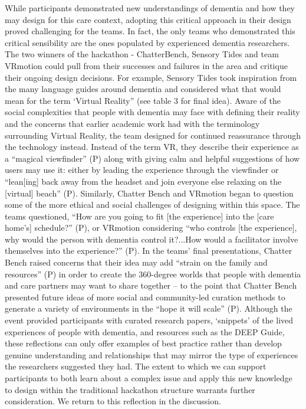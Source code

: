 While participants demonstrated new understandings of dementia and how they may design for this care context, adopting this critical approach in their design proved challenging for the teams. In fact, the only teams who demonstrated this critical sensibility are the ones populated by experienced dementia researchers. The two winners of the hackathon - ChatterBench, Sensory Tides and team VRmotion could pull from their successes and failures in the area and critique their ongoing design decisions. For example, Sensory Tides took inspiration from the many language guides around dementia and considered what that would mean for the term ‘Virtual Reality” (see table 3 for final idea). Aware of the social complexities that people with dementia may face with defining their reality and the concerns that earlier academic work had with the terminology surrounding Virtual Reality, the team designed for continued reassurance through the technology instead. Instead of the term VR, they describe their experience as a “magical viewfinder” (P) along with giving calm and helpful suggestions of how users may use it: either by leading the experience through the viewfinder or “lean[ing] back away from the headset and join everyone else relaxing on the [virtual] beach” (P). Similarly, Chatter Bench and VRmotion began to question some of the more ethical and social challenges of designing within this space. The teams questioned, “How are you going to fit [the experience] into the [care home’s] schedule?” (P), or VRmotion considering “who controls [the experience], why would the person with dementia control it?...How would a facilitator involve themselves into the experience?” (P). In the teams’ final presentations, Chatter Bench raised concerns that their idea may add “strain on the family and resources” (P) in order to create the 360-degree worlds that people with dementia and care partners may want to share together – to the point that Chatter Bench presented future ideas of more social and community-led curation methods to generate a variety of environments in the “hope it will scale” (P). Although the event provided participants with curated research papers, ‘snippets’ of the lived experiences of people with dementia, and resources such as the DEEP Guide, these reflections can only offer examples of best practice rather than develop genuine understanding and relationships that may mirror the type of experiences the researchers suggested they had.  The extent to which we can support participants to both learn about a complex issue and apply this new knowledge to design within the traditional hackathon structure warrants further consideration. We return to this reflection in the discussion. 

